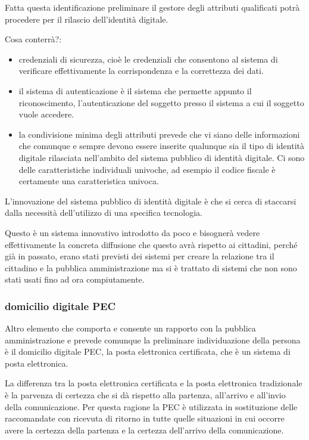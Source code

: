 Fatta questa identificazione preliminare il gestore degli attributi qualificati potrà procedere per il rilascio dell'identità digitale.

Cosa conterrà?:

\begin{itemize}
    \item credenziali di sicurezza, cioè le credenziali che consentono al sistema di verificare effettivamente la corrispondenza e la correttezza dei dati.
    \item il sistema di autenticazione è il sistema che permette appunto il riconoscimento, l'autenticazione del soggetto presso il sistema a cui il soggetto vuole accedere.
    \item la condivisione minima degli attributi prevede che vi siano delle informazioni che comunque e sempre devono essere inserite qualunque sia il tipo di identità digitale rilasciata nell'ambito del sistema pubblico di identità digitale. Ci sono delle caratteristiche individuali univoche, ad esempio il codice fiscale è certamente una caratteristica univoca.
\end{itemize}

L'innovazione del sistema pubblico di identità digitale è che si cerca di staccarsi dalla necessità dell'utilizzo di una specifica tecnologia.    

Questo è un sistema innovativo introdotto da poco e bisognerà vedere effettivamente la concreta diffusione che questo avrà rispetto ai cittadini, perché già in passato, erano stati previsti dei sistemi per creare la relazione tra il cittadino e la pubblica amministrazione ma si è trattato di sistemi che non sono stati usati fino ad ora compiutamente.

\subsubsection{domicilio digitale PEC}

Altro elemento che comporta e consente un rapporto con la pubblica amministrazione e prevede comunque la preliminare individuazione della persona è il domicilio digitale PEC, la posta elettronica certificata, che è un sistema di posta elettronica. 

La differenza tra la posta elettronica certificata e la posta elettronica tradizionale è la parvenza di certezza che si dà rispetto alla partenza, all'arrivo e all'invio della comunicazione. Per questa ragione la PEC è utilizzata in sostituzione delle raccomandate con ricevuta di ritorno in tutte quelle situazioni in cui occorre avere la certezza della partenza e la certezza dell'arrivo della comunicazione.

